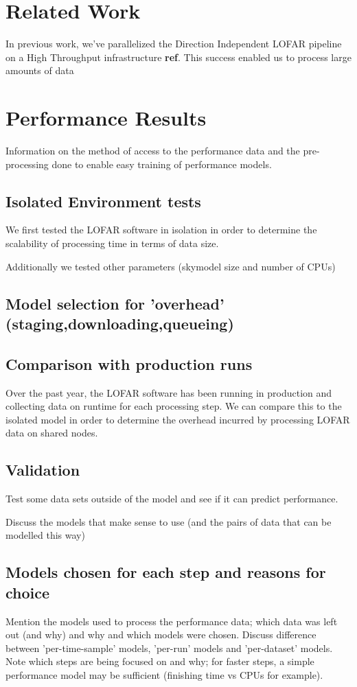 \documentclass[preprint,5p]{elsarticle}
\begin{document}
\section{Related Work}\label{sec:related}
In previous work, we've parallelized the Direction Independent LOFAR pipeline on a High Throughput infrastructure \textbf{ref}. This success enabled us to process large amounts of data 




\section{Performance Results}\label{sec:results}

Information on the method of access to the performance data and the pre-processing done to enable easy training of performance models.     

\subsection{Isolated Environment tests}
We first tested the LOFAR software in isolation in order to determine the scalability of processing time in terms of data size. 

Additionally we tested other parameters (skymodel size and number of CPUs)
\subsection{Model selection for 'overhead' (staging,downloading,queueing)}

\subsection{Comparison with production runs}
Over the past year, the LOFAR software has been running in production and collecting data on runtime for each processing step. We can compare this to the isolated model in order to determine the overhead incurred by processing LOFAR data on shared nodes. 

\subsection{Validation}
Test some data sets outside of the model and see if it can predict performance. 

Discuss the models that make sense to use (and the pairs of data that can be modelled this way) 


\subsection{Models chosen for each step and reasons for choice}
Mention the models used to process the performance data; which data was left out (and why) and why and which models were chosen. Discuss difference between 'per-time-sample' models, 'per-run' models and 'per-dataset' models. Note which steps are being focused on and why; for faster steps, a simple performance model may be sufficient (finishing time vs CPUs for example).  
\end{document}
